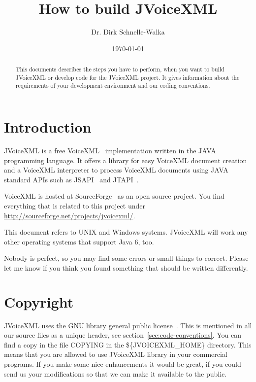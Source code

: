\documentclass[11pt,a4paper]{article}
\title{How to build JVoiceXML \jvxmlversion}
\author{Dr. Dirk Schnelle-Walka}
\date{\today}
\begin{document}
\pagestyle{empty}

\maketitle

\pagestyle{headings}

\tableofcontents

\newpage

\begin{abstract}
This documents describes the steps you have to perform, when you want
to build JVoiceXML or develop code for the JVoiceXML project. It gives
information about the requirements of your development environment 
and our coding conventions.
\end{abstract}

\section{Introduction}
\label{sec:introduction}

JVoiceXML is a free VoiceXML~\cite{w3.org:voicexml} implementation written in 
the JAVA programming language. It offers a library for easy VoiceXML
document creation and a VoiceXML interpreter to process 
VoiceXML documents using JAVA standard APIs such as JSAPI~\cite{sun:jsapi} and
JTAPI~\cite{sun:jsapi}.

VoiceXML is hosted at SourceForge~\cite{sourceforge} as an open source project.
You find everything that is related to this project under
\url{http://sourceforge.net/projects/jvoicexml/}.

This document refers to UNIX and Windows systems. JVoiceXML will work 
any other operating systems that support Java 6, too.

Nobody is perfect, so you may find some errors or small things to correct.
Please let me know if you think you found something that should be written
differently.

\section{Copyright}
\label{sec:copyright}

JVoiceXML uses the GNU library general public license~\cite{gnu:lgpg}. 
This is mentioned in all our source files as a unique header, see
section~\ref{sec:code-conventions}.
You can find a copy in the file COPYING in the \$\{JVOICEXML\_HOME\}
directory. This means that you are allowed to use JVoiceXML
library in your commercial programs. If you make some nice
enhancements it would be great, if you could send us your
modifications so that we can make it available to the public.
\end{document}

